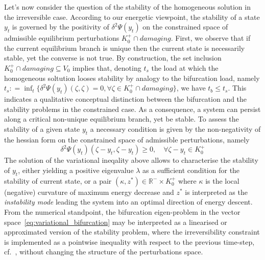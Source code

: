 Let's now consider the question of the stability of the homogeneous solution in the irreversible case. According to our energetic viewpoint, the stability of a state $y_t$ is governed by the positivity of $\delta^2 \Psi(y_t)$ on the constrained space of admissible equilibrium perturbations $K^+_0 \cap damaging$.
First, we observe that if the current equilibrium branch is unique then the current state is necessarily stable, yet the converse is not true.
By construction, the set inclusion $K^+_0 \cap damaging \subseteq V_0$ implies that, denoting $t_s$ the load at which the homogeneous soltution looses stability by analogy to the bifurcation load, namely $t_s: = \inf_t \{\delta^2 \Psi(y_t)(\zeta, \zeta) =0, \forall \zeta \in K^+_0 \cap damaging \}$, we have $t_b \leq t_s$.
This indicates a qualitative conceptual distinction between the bifurcation and the stability problems in the constrained case. As a consequence, a system can persist along a critical non-unique equilibrium branch, yet be stable. 
To assess the stability of a given state $y_t$ a necessary condition is given by the non-negativity of the hessian form on the constrained space of admissible perturbations, namely
\begin{equation}
     \label{eq:variational_stability}
     \delta^2 \Psi(y_t)(\zeta - y_t,  \zeta - y_t)  \geq 0, \quad \forall \zeta-y_t \in K^+_{0}
 \end{equation}
The solution of the variational ineqality above allows to characterise the stability of $y_t$, either yielding a positive eigenvalue $\lambda$ as a sufficient condition for the stability of current state, or a pair $(\kappa, z^*)\in \mathbb{R}^-\times K^+_0$ where $\kappa$ is the local (negative) curvature of maximum energy decrease and $z^*$ is interpreted as the \emph{instability mode} leading the system into an optimal direction of energy descent. 
From the numerical standpoint, the bifurcation eigen-problem in the vector space~\eqref{eq:variational_bifurcation} may be interpreted as a linearised or approximated version of the stability problem, where the irreversibility constraint is implemented as a pointwise inequality with respect to the previous time-step, cf.~\cite{Baldelli2021-gc}, without changing the structure of the perturbations space.
